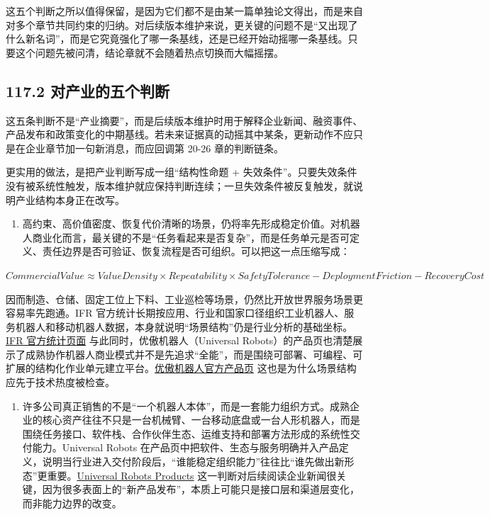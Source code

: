这五个判断之所以值得保留，是因为它们都不是由某一篇单独论文得出，而是来自对多个章节共同约束的归纳。对后续版本维护来说，更关键的问题不是“又出现了什么新名词”，而是它究竟强化了哪一条基线，还是已经开始动摇哪一条基线。只要这个问题先被问清，结论章就不会随着热点切换而大幅摇摆。

\subsection*{117.2 对产业的五个判断}


这五条判断不是“产业摘要”，而是后续版本维护时用于解释企业新闻、融资事件、产品发布和政策变化的中期基线。若未来证据真的动摇其中某条，更新动作不应只是在企业章节加一句新消息，而应回调第 20-26 章的判断链条。

更实用的做法，是把产业判断写成一组“结构性命题 + 失效条件”。只要失效条件没有被系统性触发，版本维护就应保持判断连续；一旦失效条件被反复触发，就说明产业结构本身正在改写。

\begin{enumerate}
\item 高约束、高价值密度、恢复代价清晰的场景，仍将率先形成稳定价值。对机器人商业化而言，最关键的不是“任务看起来是否复杂”，而是任务单元是否可定义、责任边界是否可验证、恢复流程是否可组织。可以把这一点压缩写成：
\end{enumerate}

\(\scriptstyle Commercial Value \approx  Value Density \times  Repeatability \times  Safety Tolerance - Deployment Friction - Recovery Cost\)

因而制造、仓储、固定工位上下料、工业巡检等场景，仍然比开放世界服务场景更容易率先跑通。IFR 官方统计长期按应用、行业和国家口径组织工业机器人、服务机器人和移动机器人数据，本身就说明“场景结构”仍是行业分析的基础坐标。\href{https://ifr.org/worldrobotics/}{IFR 官方统计页面} 与此同时，优傲机器人（Universal Robots）的产品页也清楚展示了成熟协作机器人商业模式并不是先追求“全能”，而是围绕可部署、可编程、可扩展的结构化作业单元建立平台。\href{https://www.universal-robots.com/products/}{优傲机器人官方产品页} 这也是为什么场景结构应先于技术热度被检查。

\begin{enumerate}
\item 许多公司真正销售的不是“一个机器人本体”，而是一套能力组织方式。成熟企业的核心资产往往不只是一台机械臂、一台移动底盘或一台人形机器人，而是围绕任务接口、软件栈、合作伙伴生态、运维支持和部署方法形成的系统性交付能力。Universal Robots 在产品页中把软件、生态与服务明确并入产品定义，说明当行业进入交付阶段后，“谁能稳定组织能力”往往比“谁先做出新形态”更重要。\href{https://www.universal-robots.com/products/}{Universal Robots Products} 这一判断对后续阅读企业新闻很关键，因为很多表面上的“新产品发布”，本质上可能只是接口层和渠道层变化，而非能力边界的改变。
\end{enumerate}

